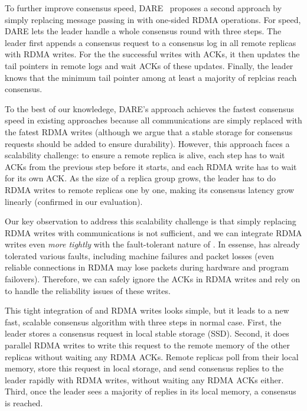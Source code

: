 To further improve consensus speed, DARE~\cite{dare:hpdc15} proposes a second 
approach by simply replacing message passing in \paxos with one-sided RDMA 
operations. For speed, DARE lets the leader handle a whole consensus round
with three steps. The leader first appends a consensus request to a consensus 
log in all remote replicas with RDMA writes. For the the successful writes with 
ACKs, it then updates the tail pointers in remote logs and wait ACKs of these 
updates. Finally, the leader knows that the minimum tail pointer among at 
least a majority of replcias reach consensus.

To the best of our knowledege, DARE's approach achieves the fastest consensus 
speed in existing approaches because all communications are simply replaced 
with the fatest RDMA writes (although we argue that a stable storage for 
consensus requests should be added to ensure \paxos durability). However, this 
approach faces a scalability challenge: to ensure a remote replica is alive, 
each step has to wait ACKs from the previous step before it starts, and each 
RDMA write has to wait for its own ACK. As the size of a replica group grows, 
the leader has to do RDMA writes to remote replicas one by one, making its 
consensus latency grow linearly (confirmed in our evaluation).

Our key observation to address this scalability challenge is that simply 
replacing RDMA writes with \paxos communications is not sufficient, and we can 
integrate RDMA writes even \emph{more tightly} with the fault-tolerant nature 
of \paxos. In essense, \paxos has already tolerated various faults, including 
machine failures and packet losses (even reliable connections in RDMA may lose 
packets during hardware and program failovers). Therefore, we can safely ignore 
the ACKs in RDMA writes and rely on \paxos to handle the reliability issues of 
these writes.

This tight integration of \paxos and RDMA writes looks simple, but it leads to 
a new fast, scalable \paxos consensus algorithm with three steps in normal 
case. First, the leader stores a consensus request in local stable storage 
(SSD). Second, it does parallel RDMA writes to write this request to the remote 
memory of the other replicas without waiting any RDMA ACKs. Remote replicas poll 
from their local memory, store this request in local storage, and send 
consensus replies to the leader rapidly with RDMA writes, without waiting any 
RDMA ACKs either. Third, once the leader sees a majority of replies in its local 
memory, a consensus is reached.

